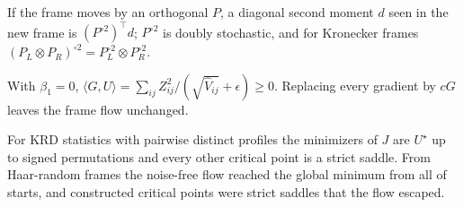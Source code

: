 \begin{theorem}\label{thm:transport}
If the frame moves by an orthogonal $P$, a diagonal second moment $d$ seen in the new frame is
$(P^{\circ2})^\top d$; $P^{\circ2}$ is doubly stochastic, and for Kronecker frames
$(P_L\otimes P_R)^{\circ2}=P_L^{\circ2}\otimes P_R^{\circ2}$.
\end{theorem}

\begin{theorem}\label{thm:descent}
With $\beta_1=0$, $\langle G,U\rangle=\sum_{ij}Z_{ij}^2/(\sqrt{\hat V_{ij}}+\epsilon)\ge0$. Replacing
every gradient by $cG$ leaves the frame flow unchanged.
\end{theorem}

\begin{conjecture}
For KRD statistics with pairwise distinct profiles the minimizers of $J$ are $U^\star$ up to signed
permutations and every other critical point is a strict saddle. From Haar-random frames the
noise-free flow reached the global minimum from all \LandscapeGlobal{} of \LandscapeStarts{} starts, and constructed
critical points were strict saddles that the flow escaped.
\end{conjecture}
